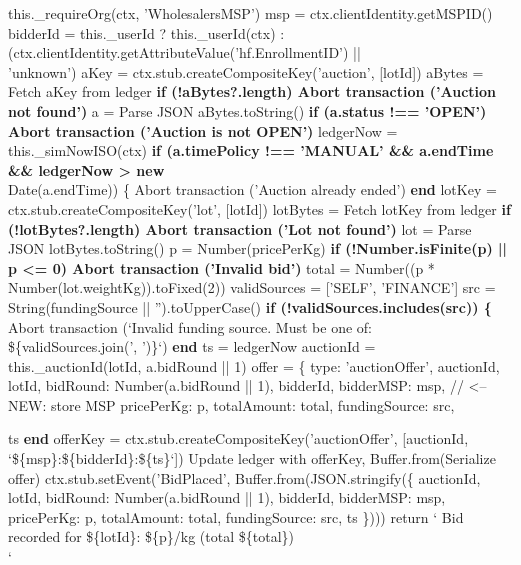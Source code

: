 \documentclass[12pt]{article}
\begin{document}
\begin{algorithm}[H]
\caption{placeBid() (Part 1 of 2)}
this.\_requireOrg(ctx, 'WholesalersMSP')\;
msp = ctx.clientIdentity.getMSPID()\;
bidderId = this.\_userId ? this.\_userId(ctx)\;
: (ctx.clientIdentity.getAttributeValue('hf.EnrollmentID') ||\\
\quad 'unknown')\;
aKey = ctx.stub.createCompositeKey('auction', [lotId])\;
aBytes = Fetch aKey from ledger\;
\textbf{if (!aBytes?.length) Abort transaction ('Auction not found')}\;
a = Parse JSON aBytes.toString()\;
\textbf{if (a.status !== 'OPEN') Abort transaction ('Auction is not OPEN')}\;
ledgerNow = this.\_simNowISO(ctx)\;
\textbf{if (a.timePolicy !== 'MANUAL' \&\& a.endTime \&\& ledgerNow > new}\\
\quad Date(a.endTime)) \{\;
Abort transaction ('Auction already ended')\;
\textbf{end}\;
lotKey = ctx.stub.createCompositeKey('lot', [lotId])\;
lotBytes = Fetch lotKey from ledger\;
\textbf{if (!lotBytes?.length) Abort transaction ('Lot not found')}\;
lot = Parse JSON lotBytes.toString()\;
p = Number(pricePerKg)\;
\textbf{if (!Number.isFinite(p) || p <= 0) Abort transaction ('Invalid bid')}\;
total = Number((p * Number(lot.weightKg)).toFixed(2))\;
validSources = ['SELF', 'FINANCE']\;
src = String(fundingSource || '').toUpperCase()\;
\textbf{if (!validSources.includes(src)) \{}\;
Abort transaction (`Invalid funding source. Must be one of:\\
\quad \$\{validSources.join(', ')\}`)\;
\textbf{end}\;
ts = ledgerNow\;
auctionId = this.\_auctionId(lotId, a.bidRound || 1)\;
offer = \{\;
type: 'auctionOffer',\;
auctionId,\;
lotId,\;
bidRound: Number(a.bidRound || 1),\;
bidderId,\;
bidderMSP: msp,                   // <-- NEW: store MSP\;
pricePerKg: p,\;
totalAmount: total,\;
fundingSource: src,\;
\end{algorithm}


\begin{algorithm}[H]
\caption{placeBid() (Part 2 of 2)}
ts\;
\textbf{end}\;
offerKey = ctx.stub.createCompositeKey('auctionOffer', [auctionId,\\
\quad `\$\{msp\}:\$\{bidderId\}:\$\{ts\}`])\;
Update ledger with offerKey, Buffer.from(Serialize offer)\;
ctx.stub.setEvent('BidPlaced', Buffer.from(JSON.stringify(\{\;
auctionId,\;
lotId,\;
bidRound: Number(a.bidRound || 1),\;
bidderId,\;
bidderMSP: msp,\;
pricePerKg: p,\;
totalAmount: total,\;
fundingSource: src,\;
ts\;
\})))\;
return ` Bid recorded for \$\{lotId\}: \$\{p\}/kg (total \$\{total\})\\
\quad [\$\{src\}]`\;
\end{algorithm}
\end{document}
